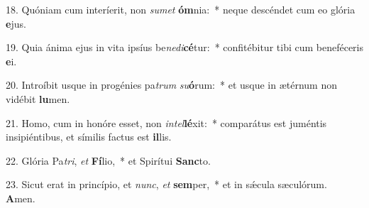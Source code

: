 18. Quóniam cum interíerit, non \textit{su}\textit{met} \textbf{óm}nia:~*  neque descéndet cum eo glória \textbf{e}jus.\

19. Quia ánima ejus in vita ipsíus be\textit{ne}\textit{di}\textbf{cé}tur:~*  confitébitur tibi cum beneféceris \textbf{e}i.\

20. Introíbit usque in progénies pa\textit{trum} \textit{su}\textbf{ó}rum:~*  et usque in ætérnum non vidébit \textbf{lu}men.\

21. Homo, cum in honóre esset, non \textit{in}\textit{tel}\textbf{lé}xit:~*  comparátus est juméntis insipiéntibus, et símilis factus est \textbf{il}lis.\

22. Glória Pa\textit{tri}, \textit{et} \textbf{Fí}lio,~*  et Spirítui \textbf{Sanc}to.\

23. Sicut erat in princípio, et \textit{nunc}, \textit{et} \textbf{sem}per,~*  et in sǽcula sæculórum. \textbf{A}men.\

